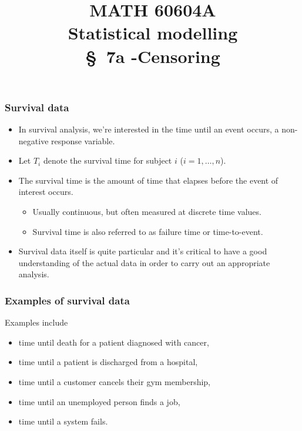 \documentclass{beamer}
\title[\color{white}{MATH 60604A \S~7a -Censoring}]{\texorpdfstring{MATH 60604A \\Statistical modelling \\ \S~7a -Censoring}{MATH 60604A \\Statistical modelling \\ \S~7a -Censoring}}
\author{}
\institute{HEC Montréal\\
Department of Decision Sciences}
\date{}
\begin{document}
\frame{\titlepage}
\begin{frame}
\frametitle{Survival data}
\begin{itemize} 
\item In \alert{survival analysis}, we're interested in the time until an event occurs, a non-negative response variable.
\item Let $T_i$ denote the \alert{survival time} for subject $i$ ($i=1, \ldots, n$).
\item The survival time is the amount of time that elapses before the event of interest occurs. 
\begin{itemize}
\vp \vp
\item Usually continuous, but often measured at discrete time values.
\item Survival time is also referred to as \alert{failure time} or \alert{time-to-event}.
\end{itemize}
\item Survival data itself is quite particular and it's critical to have a good understanding of the actual data in order to carry out an appropriate analysis.
\end{itemize}
\end{frame}

\begin{frame}
\frametitle{Examples of survival data }
Examples include
\begin{itemize}
\vp \vp
\item time until death for a patient diagnosed with cancer,
\item time until a patient is discharged from a hospital,
\item time until a customer cancels their gym membership,
\item time until an unemployed person finds a job,
\item time until a system fails.
\end{itemize}
\end{frame}
\end{document}
